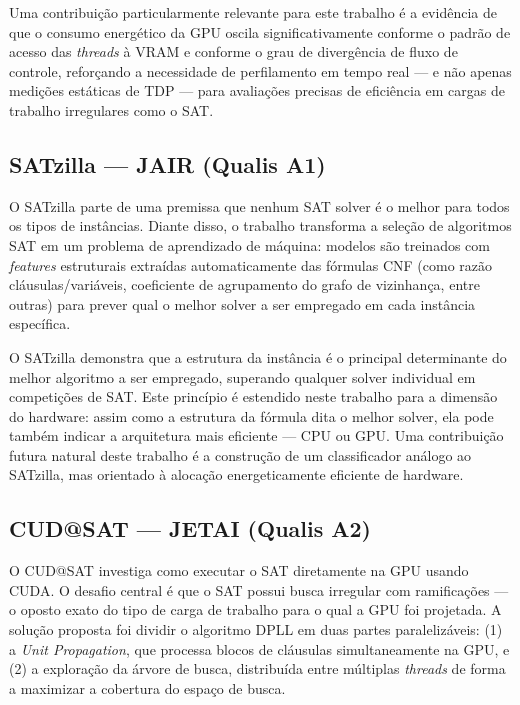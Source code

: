 \documentclass[12pt]{article}
\begin{document}
Uma contribuição particularmente relevante para este trabalho é a evidência de que o consumo energético da GPU oscila significativamente conforme o padrão de acesso das \textit{threads} à VRAM e conforme o grau de divergência de fluxo de controle, reforçando a necessidade de perfilamento em tempo real — e não apenas medições estáticas de TDP — para avaliações precisas de eficiência em cargas de trabalho irregulares como o SAT.

\subsection{SATzilla — JAIR (Qualis A1)}

O SATzilla \cite{satzilla:2008} parte de uma premissa que nenhum SAT solver é o melhor para todos os tipos de instâncias. Diante disso, o trabalho transforma a seleção de algoritmos SAT em um problema de aprendizado de máquina: modelos são treinados com \textit{features} estruturais extraídas automaticamente das fórmulas CNF (como razão cláusulas/variáveis, coeficiente de agrupamento do grafo de vizinhança, entre outras) para prever qual o melhor solver a ser empregado em cada instância específica.

O SATzilla demonstra que a estrutura da instância é o principal determinante do melhor algoritmo a ser empregado, superando qualquer solver individual em competições de SAT. Este princípio é estendido neste trabalho para a dimensão do hardware: assim como a estrutura da fórmula dita o melhor solver, ela pode também indicar a arquitetura mais eficiente — CPU ou GPU. Uma contribuição futura natural deste trabalho é a construção de um classificador análogo ao SATzilla, mas orientado à alocação energeticamente eficiente de hardware.

\subsection{CUD@SAT — JETAI (Qualis A2)}

O CUD@SAT \cite{cudaatsat:2013} investiga como executar o SAT diretamente na GPU usando CUDA. O desafio central é que o SAT possui busca irregular com ramificações — o oposto exato do tipo de carga de trabalho para o qual a GPU foi projetada. A solução proposta foi dividir o algoritmo DPLL em duas partes paralelizáveis: (1) a \textit{Unit Propagation}, que processa blocos de cláusulas simultaneamente na GPU, e (2) a exploração da árvore de busca, distribuída entre múltiplas \textit{threads} de forma a maximizar a cobertura do espaço de busca.
\end{document}
